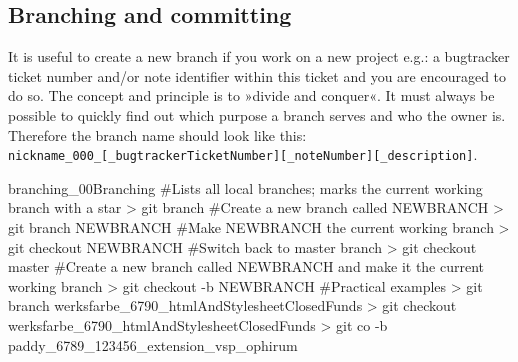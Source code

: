 \subsection{Branching and committing}\label{sec:branching_and_comitting}
It is useful to create a new branch if you work on a new project e.g.: a bugtracker ticket number and/or note identifier within this ticket and you are encouraged to do so. The concept and principle is to »divide and conquer«. It must always be possible to quickly find out which purpose a branch serves and who the owner is. Therefore the branch name should look like this:\\ \texttt{nickname\_000\_{[\_bugtrackerTicketNumber]}{[\_noteNumber]}{[\_description]}}.
\begin{codelisting}{branching_00}{Branching}
#Lists all local branches; marks the current working branch with a star
> git branch
#Create a new branch called NEWBRANCH
> git branch NEWBRANCH
#Make NEWBRANCH the current working branch
> git checkout NEWBRANCH
#Switch back to master branch
> git checkout master
#Create a new branch called NEWBRANCH and make it the current working branch
> git checkout -b NEWBRANCH
#Practical examples
> git branch werksfarbe_6790_htmlAndStylesheetClosedFunds
> git checkout werksfarbe_6790_htmlAndStylesheetClosedFunds
> git co -b paddy_6789_123456_extension_vsp_ophirum
\end{codelisting}
